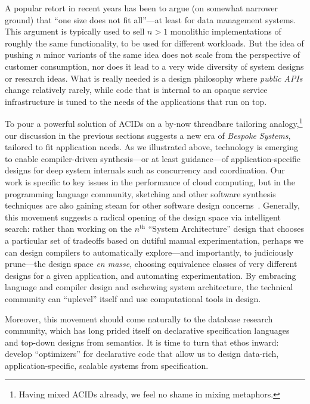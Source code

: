 \documentclass{sig-alternate}
\begin{document}
A popular retort in recent years has been to argue (on somewhat narrower ground)
that ``one size does not fit all''---at least for data management systems.  This
argument is typically used to sell $n>1$ monolithic implementations of roughly the same functionality, to be used for different workloads.  But the idea of pushing $n$ minor variants of the same idea does not scale from the perspective of customer consumption, nor does it lead to a very wide diversity of system designs or research ideas.  What is really needed is a design philosophy where \emph{public APIs} change relatively rarely, while code that is internal to an opaque service infrastructure is tuned to the needs of the applications that run on top.

To pour a powerful solution of ACIDs on a by-now threadbare tailoring
analogy,\footnote{Having mixed ACIDs already, we feel no shame in mixing
  metaphors.} our discussion in the previous sections suggests a new era of
\emph{Bespoke Systems}, tailored to fit application needs.  As we illustrated
above, technology is emerging to enable compiler-driven synthesis---or at least
guidance---of application-specific designs for deep system internals such as concurrency and coordination.  Our work is specific to key issues in the performance of cloud computing, but in the programming language community, sketching and other software synthesis techniques are also gaining steam for other software design concerns~\cite{Kuncak2012}.  Generally, this movement suggests a radical opening of the design space via intelligent search: rather than working on the $n^\textrm{th}$ ``System Architecture'' design that chooses a particular set of tradeoffs based on dutiful manual experimentation, perhaps we can design compilers to automatically explore---and importantly, to judiciously prune---the design space \emph{en masse}, choosing equivalence classes of very different designs for a given application, and automating experimentation.  By embracing language and compiler design and eschewing system architecture, the technical community can ``uplevel'' itself and use computational tools in design.

Moreover, this movement should come naturally to the database research community, which has long prided itself on declarative specification languages and top-down designs from semantics.  It is time to turn that ethos inward: develop ``optimizers'' for declarative code that allow us to design data-rich, application-specific, scalable systems from specification.




\end{document}
